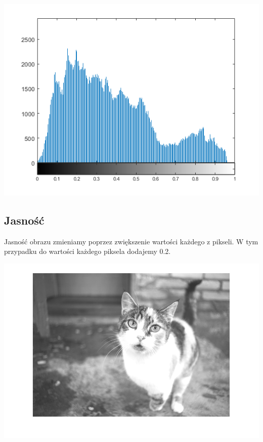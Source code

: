 \documentclass{article}
\begin{document}
	\begin{center}
		\includegraphics[width=\linewidth]{../../lab02/cat_gray_hist.png}
		\label{fig:cat_gray_hist}
	\end{center}
	
	
	\subsection{Jasność}
	Jasność obrazu zmieniamy poprzez zwiększenie wartości każdego z pikseli. W tym przypadku do wartości każdego piksela dodajemy 0.2.
	
	\begin{center}
		\includegraphics[width=\linewidth]{../../lab02/cat_bright.png}
		\label{fig:cat_bright}
	\end{center}
	
\end{document}
